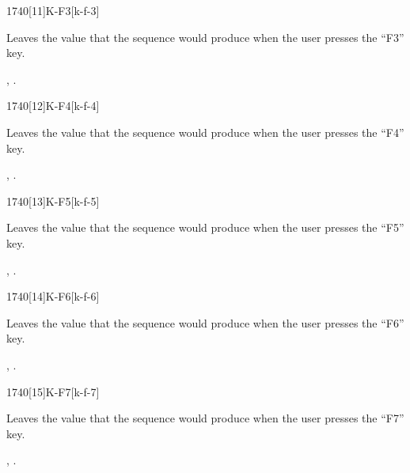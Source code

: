 \begin{worddef}{1740}[11]{K-F3}[k-f-3]%
\item {}

	Leaves the value  that the sequence 
	 would produce when the user presses the
	``F3'' key.

\see {},
	.
\end{worddef}


\begin{worddef}{1740}[12]{K-F4}[k-f-4]%
\item {}

	Leaves the value  that the sequence 
	 would produce when the user presses the
	``F4'' key.

\see {},
	.
\end{worddef}


\begin{worddef}{1740}[13]{K-F5}[k-f-5]%
\item {}

	Leaves the value  that the sequence 
	 would produce when the user presses the
	``F5'' key.

\see {},
	.
\end{worddef}


\begin{worddef}{1740}[14]{K-F6}[k-f-6]%
\item {}

	Leaves the value  that the sequence 
	 would produce when the user presses the
	``F6'' key.

\see {},
	.
\end{worddef}


\begin{worddef}{1740}[15]{K-F7}[k-f-7]%
\item {}

	Leaves the value  that the sequence 
	 would produce when the user presses the
	``F7'' key.

\see {},
	.
\end{worddef}


